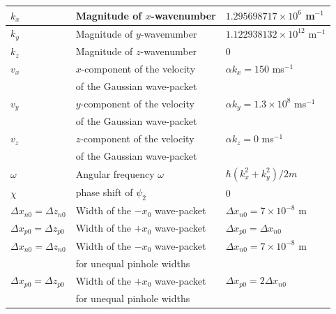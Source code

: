 \documentclass[12pt]{article}       %
\begin{document}
\begin{center}
\begin{tabular}{|l|l|l|}
$k_x$ &         Magnitude of $x$-wavenumber                     &   $1.295698717\times10^6$ m$^{-1}$                               \\    \hline
$k_y$ &        Magnitude of $y$-wavenumber                      &   $1.122938132\times10^{12}$   m$^{-1}$                  \\    \hline
$k_z$ &          Magnitude of $z$-wavenumber                       &   $0$                               \\    \hline
$v_x$ &          $x$-component of the velocity                   &   $\alpha k_x=150$ ms$^{-1}$                 \\      
            &          of the Gaussian wave-packet                     &                                                  \\    \hline
$v_y$ &          $y$-component of the velocity                   &   $\alpha k_y=1.3\times 10^8$   ms$^{-1}$                \\      
            &          of the Gaussian wave-packet                     &                                                  \\    \hline
$v_z$ &          $z$-component of the velocity                   &   $\alpha k_z=0$   ms$^{-1}$                \\      
            &          of the Gaussian wave-packet                      &                                                  \\    \hline
$\omega$ &   Angular frequency       $\omega$                     &   $\hbar(k_x^2+k_y^2)/2m$                         \\    \hline
$\chi$ &          phase shift of $\psi_2$                     &   $0$                         \\    \hline
$\Delta x_{n0}=\Delta z_{n0}$ &     Width of the $-x_0$  wave-packet      &   $\Delta x_{n0}=7\times 10^{-8}$  m    \\    \hline
$\Delta x_{p0}=\Delta z_{p0}$ &     Width of the $+x_0$ wave-packet      &   $\Delta x_{p0}=\Delta x_{n0}$      \\    \hline
$\Delta x_{n0}=\Delta z_{n0}$ &     Width of the $-x_0$  wave-packet     &    $\Delta x_{n0}=7\times 10^{-8}$   m      \\                                                                                     
                               &      for unequal pinhole widths  &                                                                                                               \\    \hline
$\Delta x_{p0}=\Delta z_{p0}$ &     Width of the $+x_0$ wave-packet    &         $\Delta x_{p0}=2\Delta x_{n0}$     \\                                                                                   
                              &        for unequal pinhole widths &                                                                                                                  \\    \hline
\end{tabular}
\end{center}
\end{document}
